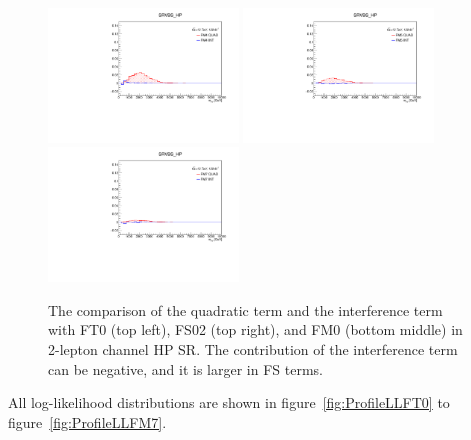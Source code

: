 \begin{figure}[]
        \includegraphics[width=0.45\textwidth]{figures/aQGC/FM4_0ptag1pfat0pjet_0ptv_SRVBS_HP_MllJ.pdf}
        \includegraphics[width=0.45\textwidth]{figures/aQGC/FM5_0ptag1pfat0pjet_0ptv_SRVBS_HP_MllJ.pdf}
        \includegraphics[width=0.45\textwidth]{figures/aQGC/FM7_0ptag1pfat0pjet_0ptv_SRVBS_HP_MllJ.pdf}
        \caption{The comparison of the quadratic term and the interference term with FT0 (top left), FS02 (top right), and FM0 (bottom middle) in 2-lepton channel HP SR. The contribution of the interference term can be negative, and it is larger in FS terms. }
        \label{fig:quadintFM}
\end{figure}


All log-likelihood distributions are shown in figure~\ref{fig:ProfileLLFT0} to figure~\ref{fig:ProfileLLFM7}.

